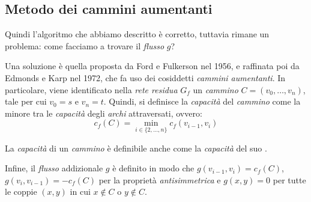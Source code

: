 \subsection{Metodo dei cammini aumentanti}
Quindi l'algoritmo che abbiamo descritto è corretto, tuttavia rimane un problema:
come facciamo a trovare il \emph{flusso} $g$?

Una soluzione è quella proposta da Ford e Fulkerson nel 1956, e raffinata poi
da Edmonds e Karp nel 1972, che fa uso dei cosiddetti \emph{cammini aumentanti}.
In particolare, viene identificato nella \emph{rete residua} $G_f$ un
\emph{cammino} $C=(v_0,\dots,v_n)$, tale per cui $v_0=s$ e $v_n=t$. Quindi, si
definisce la \emph{capacità} del \emph{cammino} come la minore tra le
\emph{capacità} degli \emph{archi} attraversati, ovvero:
\[c_f(C)=\min_{i\in\{2,\dots,n\}}c_f(v_{i-1},v_i)\]

\begin{note}
    La \emph{capacità} di un \emph{cammino} è definibile anche come la
    \emph{capacità} del suo .
\end{note}

\noindent
Infine, il \emph{flusso} addizionale $g$ è definito in modo che $g(v_{i-1},v_i)=
c_f(C)$, $g(v_i,v_{i-1})=-c_f(C)$ per la proprietà \emph{antisimmetrica} e
$g(x,y)=0$ per tutte le coppie $(x,y)$ in cui $x\notin C$ o $y\notin C$.

